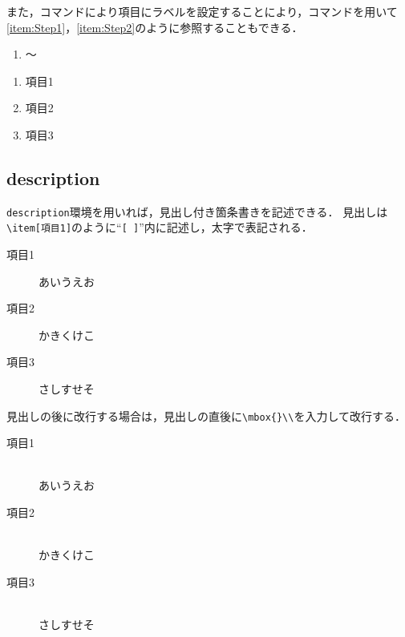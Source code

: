 \documentclass[a4j,11pt]{ujreport}
\begin{document}
また，コマンドにより項目にラベルを設定することにより，コマンドを用いて\ref{item:Step1}，\ref{item:Step2}のように参照することもできる．

\begin{code}
\begin{enumerate}[label=Step \arabic*.,leftmargin=*,font=\bfseries]
    \item 〜
\end{enumerate}
\end{code}

\begin{screen}
\begin{enumerate}[label=Step \arabic*.,leftmargin=*,font=\bfseries]
\item 項目1
\label{item:Step1}
\item 項目2
\label{item:Step2}
\item 項目3
\label{item:Step3}
\end{enumerate}
\end{screen}

\subsection{description}
\texttt{description}環境を用いれば，見出し付き箇条書きを記述できる．
見出しは\verb|\item[項目1]|のように``\texttt{[\,]}''内に記述し，太字で表記される．

\begin{screen}
\begin{description}
\item[項目1]あいうえお
\item[項目2]かきくけこ
\item[項目3]さしすせそ
\end{description}
\end{screen}

見出しの後に改行する場合は，見出しの直後に\verb|\mbox{}\\|を入力して改行する．

\begin{screen}
\begin{description}
\item[項目1]\mbox{}\\
あいうえお
\item[項目2]\mbox{}\\
かきくけこ
\item[項目3]\mbox{}\\
さしすせそ
\end{description}
\end{screen}
\end{document}
